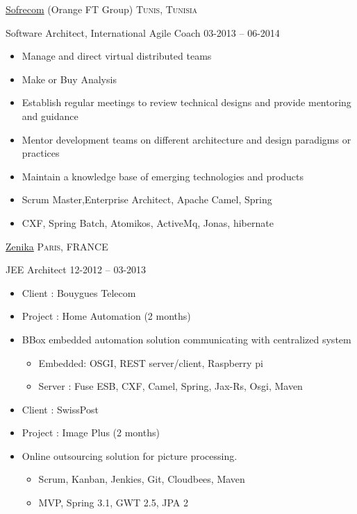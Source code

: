 \documentclass[10pt,a4paper]{article}
\begin{document}
\headedsection  %
  {\href{http://www.sofrecom.com/en}{Sofrecom} (Orange FT Group)}
  {\textsc{Tunis, Tunisia}} {%
  \headedsubsection
    {Software Architect, International Agile Coach}
    {03-2013 -- 06-2014}
    {
\begin{itemize} \itemsep -2pt  %
\item Manage and direct virtual distributed teams
\item Make or Buy Analysis
\item Establish regular meetings to review technical designs and provide mentoring and guidance
\item Mentor development teams on different architecture and design paradigms or practices
\item Maintain a knowledge base of emerging technologies and products
\item Scrum Master,Enterprise Architect, Apache Camel, Spring
\item CXF, Spring Batch, Atomikos, ActiveMq, Jonas, hibernate
\end{itemize}
}}

\headedsection  %
  {\href{http://www.zenika.com/}{Zenika} }
  {\textsc{Paris, FRANCE}} {%
  \headedsubsection
    {JEE Architect}
    {12-2012 -- 03-2013}
    {
\begin{itemize} \itemsep -2pt  %
\item Client : Bouygues Telecom
\item Project : Home Automation (2 months)
\item BBox embedded automation solution communicating with centralized system
\begin{itemize} \itemsep -2pt  %
\item Embedded: OSGI, REST server/client, Raspberry pi
\item Server : Fuse ESB, CXF, Camel, Spring, Jax-Rs, Osgi, Maven
\end{itemize}

\item Client : SwissPost
\item Project : Image Plus (2 months)
\item Online outsourcing solution for picture processing.

\begin{itemize} \itemsep -2pt  %
\item Scrum, Kanban, Jenkies, Git, Cloudbees, Maven
\item MVP, Spring 3.1, GWT 2.5, JPA 2
\end{itemize}

\end{itemize}}
}
\end{document}
